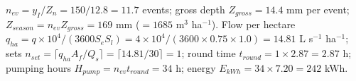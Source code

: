 \sol  $n_{ev}=y_I/Z_n=150/12.8=11.7$ events; gross depth $Z_{gross}=14.4$ mm per event; $Z_{season}=n_{ev}Z_{gross}=169$ mm ($=1685$ m$^3$ ha$^{-1}$). Flow per hectare $q_{ha}=q\times10^4/(3600S_eS_l)=4\times10^4/(3600\times0.75\times1.0)=14.81$ L s$^{-1}$ ha$^{-1}$; sets $n_{set}=\lceil q_{ha}A_f/Q_s\rceil=\lceil14.81/30\rceil=1$; round time $t_{round}=1\times2.87=2.87$ h; pumping hours $H_{pump}=n_{ev}t_{round}=34$ h; energy $E_{kWh}=34\times7.20=242$ kWh.

